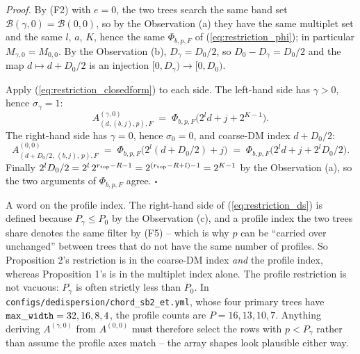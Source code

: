\documentclass{article}
\numberwithin{equation}{section}   %
\begin{document}
\medskip
\par\noindent
{\em Proof.} By (F2) with $e=0$, the two trees search the same band set
$\mathcal{B}(\gamma,0) = \mathcal{B}(0,0)$, so by the Observation (a) they have the same
multiplet set and the same $l$, $a$, $K$, hence the same $\Phi_{b,p,F}$ of
(\ref{eq:restriction_phi}); in particular $M_{\gamma,0} = M_{0,0}$. By the Observation (b),
$D_\gamma = D_0/2$, so $D_0 - D_\gamma = D_0/2$ and the map $d \mapsto d + D_0/2$ is an
injection $[0,D_\gamma) \to [0,D_0)$.

Apply (\ref{eq:restriction_closedform}) to each side. The left-hand side has $\gamma > 0$,
hence $\sigma_\gamma = 1$:
\begin{equation}
A^{(\gamma,0)}_{(d,(b,j),p),F} \;=\; \Phi_{b,p,F}\big( 2^l d + j + 2^{K-1} \big).
\end{equation}
The right-hand side has $\gamma = 0$, hence $\sigma_0 = 0$, and coarse-DM index $d + D_0/2$:
\begin{equation}
A^{(0,0)}_{(d + D_0/2,\,(b,j),\,p),F} \;=\; \Phi_{b,p,F}\big( 2^l (d + D_0/2) + j \big)
  \;=\; \Phi_{b,p,F}\big( 2^l d + j + 2^l D_0/2 \big).
\end{equation}
Finally $2^l D_0 / 2 = 2^l \, 2^{r_{\rm top}-R-1} = 2^{(r_{\rm top}-R+l)-1} = 2^{K-1}$ by the
Observation (a), so the two arguments of $\Phi_{b,p,F}$ agree. $\square$

\medskip
\par\noindent
A word on the profile index. The right-hand side of (\ref{eq:restriction_ds}) is defined
because $P_\gamma \le P_0$ by the Observation (c), and a profile index the two trees share
denotes the same filter by (F5) -- which is why $p$ can be ``carried over unchanged'' between
trees that do not have the same number of profiles. So Proposition 2's restriction is in the
coarse-DM index {\em and} the profile index, whereas Proposition 1's is in the multiplet index
alone. The profile restriction is not vacuous: $P_\gamma$ is often strictly less than $P_0$. In
{\tt configs/dedispersion/chord\_sb2\_et.yml}, whose four primary trees have
${\tt max\_width} = 32, 16, 8, 4$, the profile counts are $P = 16, 13, 10, 7$. Anything deriving
$A^{(\gamma,0)}$ from $A^{(0,0)}$ must therefore select the rows with $p < P_\gamma$ rather than
assume the profile axes match -- the array shapes look plausible either way.
\end{document}
